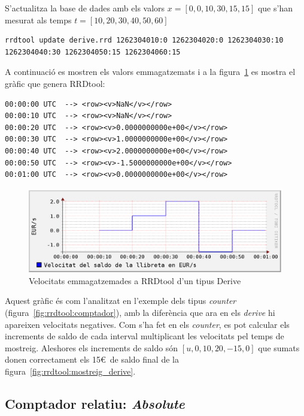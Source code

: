 S'actualitza la base de dades amb els valors $x=[0,0,10,30,15,15]$ que s'han mesurat als temps $t=[10,20,30,40,50,60]$ 

\begin{lstlisting}[style=sh]
rrdtool update derive.rrd 1262304010:0 1262304020:0 1262304030:10 1262304040:30 1262304050:15 1262304060:15
\end{lstlisting}

A continuació es mostren els valors emmagatzemats i a la figura~\ref{fig:rrdtool:derive} es mostra el gràfic que genera RRDtool:
\begin{lstlisting}
00:00:00 UTC  --> <row><v>NaN</v></row>
00:00:10 UTC  --> <row><v>NaN</v></row>
00:00:20 UTC  --> <row><v>0.0000000000e+00</v></row>
00:00:30 UTC  --> <row><v>1.0000000000e+00</v></row>
00:00:40 UTC  --> <row><v>2.0000000000e+00</v></row>
00:00:50 UTC  --> <row><v>-1.5000000000e+00</v></row>
00:01:00 UTC  --> <row><v>0.0000000000e+00</v></row>
\end{lstlisting}


\begin{figure}[htp]
  \centering
  \includegraphics[width=\textwidth]{imatges/rrdtool/derive.eps}
  \caption{Velocitats emmagatzemades a RRDtool d'un tipus Derive}
  \label{fig:rrdtool:derive}
\end{figure}

Aquest gràfic és com l'analitzat en l'exemple dels tipus \emph{counter} (figura~\ref{fig:rrdtool:comptador}), amb la diferència que ara en els \emph{derive} hi apareixen velocitats negatives. 
Com s'ha fet en els \emph{counter}, es pot calcular els increments de saldo de cada interval multiplicant les velocitats pel temps de mostreig. Aleshores els increments de saldo són $[u,0,10,20,-15,0]$ que sumats donen correctament els 15\euro\ de saldo final de la figura~\ref{fig:rrdtool:mostreig_derive}.


\subsection{Comptador relatiu: \emph{Absolute}}

